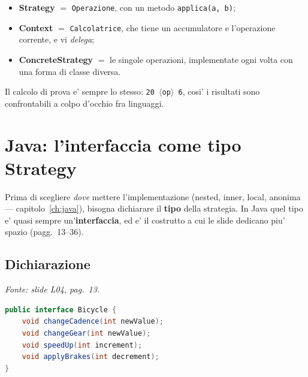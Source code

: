 \documentclass{report}
\newcommand{\code}[1]{\texttt{\small #1}}
\newcommand{\fonteslide}[1]{{\footnotesize\itshape\color{gray} Fonte: slide \emph{L04}, pag.~#1.\par}}
\begin{document}
\begin{itemize}
    \item \textbf{Strategy} $=$ \code{Operazione}, con un metodo
          \code{applica(a, b)};
    \item \textbf{Context} $=$ \code{Calcolatrice}, che tiene un
          accumulatore e l'operazione corrente, e vi \emph{delega};
    \item \textbf{ConcreteStrategy} $=$ le singole operazioni,
          implementate ogni volta con una forma di classe diversa.
\end{itemize}

Il calcolo di prova e' sempre lo stesso: \code{20 \(\langle\)op\(\rangle\)
6}, cosi' i risultati sono confrontabili a colpo d'occhio fra linguaggi.

\chapter{Java: l'interfaccia come tipo Strategy}\label{ch:interfacce}

Prima di scegliere \emph{dove} mettere l'implementazione (nested, inner,
local, anonima --- capitolo~\ref{ch:java}), bisogna dichiarare il
\textbf{tipo} della strategia. In Java quel tipo e' quasi sempre
un'\textbf{interfaccia}, ed e' il costrutto a cui le slide dedicano piu'
spazio (pagg.~13--36).

\section{Dichiarazione}


\fonteslide{13}

\begin{lstlisting}[language=Java]
public interface Bicycle {
    void changeCadence(int newValue);
    void changeGear(int newValue);
    void speedUp(int increment);
    void applyBrakes(int decrement);
}
\end{lstlisting}
\end{document}
